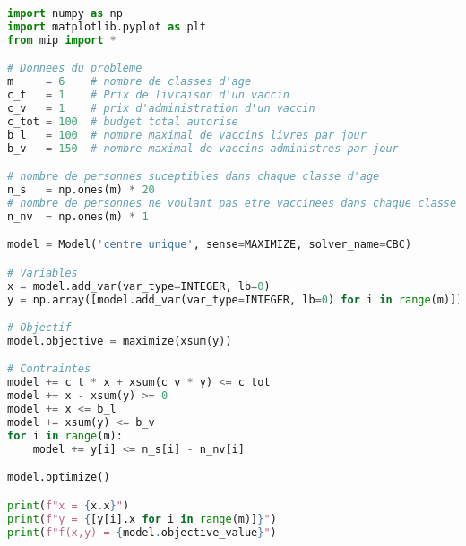 \documentclass[a4paper,11pt]{report}
\begin{document}
\newpage
\lstset{style=mystyle}

\begin{lstlisting}[language=Python]
import numpy as np
import matplotlib.pyplot as plt
from mip import *

# Donnees du probleme
m     = 6    # nombre de classes d'age
c_t   = 1    # Prix de livraison d'un vaccin
c_v   = 1    # prix d'administration d'un vaccin
c_tot = 100  # budget total autorise
b_l   = 100  # nombre maximal de vaccins livres par jour
b_v   = 150  # nombre maximal de vaccins administres par jour

# nombre de personnes suceptibles dans chaque classe d'age
n_s   = np.ones(m) * 20   
# nombre de personnes ne voulant pas etre vaccinees dans chaque classe d'age
n_nv  = np.ones(m) * 1     

model = Model('centre unique', sense=MAXIMIZE, solver_name=CBC)

# Variables
x = model.add_var(var_type=INTEGER, lb=0)                               
y = np.array([model.add_var(var_type=INTEGER, lb=0) for i in range(m)])

# Objectif
model.objective = maximize(xsum(y))

# Contraintes
model += c_t * x + xsum(c_v * y) <= c_tot
model += x - xsum(y) >= 0
model += x <= b_l
model += xsum(y) <= b_v
for i in range(m):
    model += y[i] <= n_s[i] - n_nv[i]

model.optimize()

print(f"x = {x.x}")
print(f"y = {[y[i].x for i in range(m)]}")
print(f"f(x,y) = {model.objective_value}")

\end{lstlisting}
\end{document}

